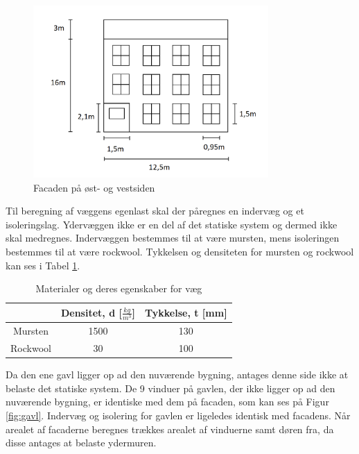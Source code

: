 \begin{figure}[H]
	\centering
	\includegraphics[width=0.8\textwidth]{billeder/facadenord.png}
	\caption{Facaden på øst- og vestsiden}
	\label{fig:facade}
\end{figure}

Til beregning af væggens egenlast skal der påregnes en indervæg og et isoleringslag. Ydervæggen ikke er en del af det statiske system og dermed ikke skal medregnes. Indervæggen bestemmes til at være mursten, mens isoleringen bestemmes til at være rockwool. Tykkelsen og densiteten for mursten og rockwool kan ses i Tabel \ref{tab:murogwool}.

\begin{table}
	\begin{center}
		\begin{tabular}{|c|c|c|}
			\hline
			& Densitet, d [$\frac{kg}{m^3}$] & Tykkelse, t [mm] \\ \hline
			Mursten  & 1500  & 130     \\ \hline
			Rockwool & 30 & 100              \\ \hline
		\end{tabular}
		\caption{Materialer og deres egenskaber for væg \citep{murstendensitet} \citep{indervaeg} \citep{densitet} \citep{isolering}}
		\label{tab:murogwool}
	\end{center}
\end{table}

Da den ene gavl ligger op ad den nuværende bygning, antages denne side ikke at belaste det statiske system. 
\newline \indent{     }  De 9 vinduer på gavlen, der ikke ligger op ad den nuværende bygning, er identiske med dem på facaden, som kan ses på Figur \ref{fig:gavl}. Indervæg og isolering for gavlen er ligeledes identisk med facadens.
\newline \indent{     }  Når arealet af facaderne beregnes trækkes arealet af vinduerne samt døren fra, da disse antages at belaste ydermuren.

